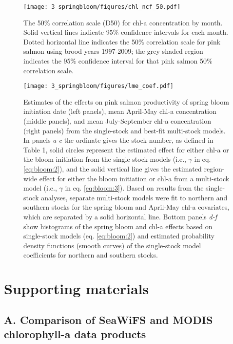 \begin{figure}[htbp]
  \centering \texttt{[image: 3\_springbloom/figures/chl\_ncf\_50.pdf]}
  \caption{The 50\% correlation scale (D50) for chl-a concentration by month.
    Solid vertical lines indicate 95\% confidence intervals for each month.
    Dotted horizontal line indicates the 50\% correlation scale for pink salmon
    using brood years 1997-2009; the grey shaded region indicates the 95\%
    confidence interval for that pink salmon 50\% correlation scale.}
  \label{fig:bloom:5}
\end{figure}

\begin{figure}[htbp]
  \centering \texttt{[image: 3\_springbloom/figures/lme\_coef.pdf]}
  \caption{Estimates of the effects on pink salmon productivity of spring bloom
    initiation date (left panels), mean April-May chl-a concentration (middle
    panels), and mean July-September chl-a concentration (right panels) from the
    single-stock and best-fit multi-stock models. In panels \emph{a-c} the
    ordinate gives the stock number, as defined in Table 1, solid circles
    represent the estimated effect for either chl-a or the bloom initiation from
    the single stock models (i.e., \(\gamma\) in eq. \ref{eq:bloom:2}), and the
    solid vertical line gives the estimated region-wide effect for either the
    bloom initiation or chl-a from a multi-stock model (i.e., \(\gamma\) in eq.
    \ref{eq:bloom:3}). Based on results from the single-stock analyses, separate
    multi-stock models were fit to northern and southern stocks for the spring
    bloom and April-May chl-a covariates, which are separated by a solid
    horizontal line. Bottom panels \emph{d-f} show histograms of the spring
    bloom and chl-a effects based on single-stock models (eq. \ref{eq:bloom:2})
    and estimated probability density functions (smooth curves) of the
    single-stock model coefficients for northern and southern stocks.}
  \label{fig:bloom:6}
\end{figure}


\newpage
\section{Supporting materials}

\subsection{A. Comparison of SeaWiFS and MODIS chlorophyll-a data products}

